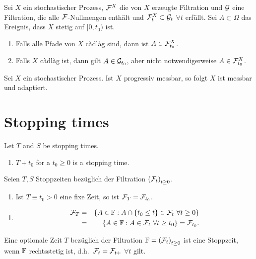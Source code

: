   Sei $X$ ein stochastischer
Prozess, $\mathcal F^{X}$ die von $X$ erzeugte Filtration und $\mathcal G$ eine Filtration,
die alle $\mathcal F$-Nullmengen enthält und $\mathcal F^{X}_t \subset \mathcal G_t$ $\forall t$
erfüllt.  Sei $A \subset \Omega$ das Ereignis, dass $X$ stetig auf $[0, t_0)$
ist. 
\begin{enumerate}
    \item Falls alle Pfade von $X$ c\`adl\`ag sind, dann ist $A \in \mathcal F^{X}_{t_0}$.
    \item Falls $X$ c\`adl\`ag ist, dann gilt $A \in \mathcal G_{t_0}$, aber nicht
        notwendigerweise $A \in \mathcal F^{X}_{t_0}$.
\end{enumerate}

 Sei $X$ ein stochastischer Prozess. Ist $X$
progressiv messbar, so folgt $X$ ist messbar und adaptiert.


\section{Stopping times}

 Let $T$ and $S$ be stopping times. 
\begin{enumerate}
    \item $T + t_0$ for a $t_0\geq 0$ is a stopping time.
\end{enumerate}

 Seien $T,S$ Stoppzeiten bezüglich der Filtration
$\left( \mathcal F_t \right)_{t \geq 0}$. 
\begin{enumerate}
    \item Ist $T \equiv t_0>0$ eine fixe Zeit, so ist $\mathcal F_T=\mathcal F_{t_0}$.
\end{enumerate}

\solution
\begin{enumerate}
    \item \begin{eqnarray}
            \mathcal F_T &=& 
            \left\{ A\in\mathbb F : A \cap \left\{ t_0 \leq t \right\}\in\mathcal F_t \ \forall t\geq 0 \right\} \\
            &=& \left\{ A\in\mathbb F : A\in\mathcal F_t \ \forall t\geq t_0 \right\} = \mathcal F_{t_0}.
        \end{eqnarray}
\end{enumerate}

 Eine optionale Zeit $T$ bezüglich
der Filtration $\mathbb F=\left( \mathcal F_t \right)_{t \geq 0}$ ist eine Stoppzeit, wenn 
$\mathbb F$ rechtsstetig ist, d.h.\ $\mathcal F_t=\mathcal F_{t+}$ $\forall t$ gilt.

